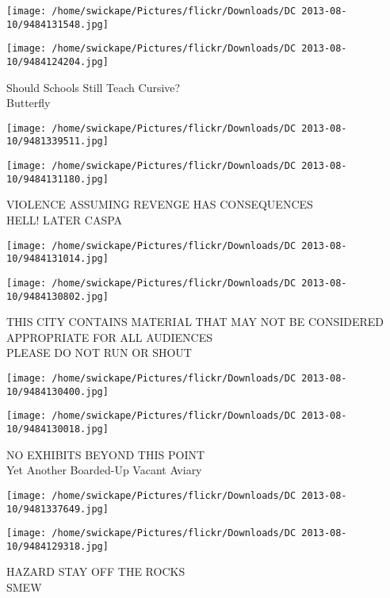 \documentclass[10pt,letterpaper]{article}
\begin{document}
\texttt{[image: /home/swickape/Pictures/flickr/Downloads/DC 2013-08-10/9484131548.jpg]}

\vspace{0.25in}
\texttt{[image: /home/swickape/Pictures/flickr/Downloads/DC 2013-08-10/9484124204.jpg]}

Should Schools Still Teach Cursive?\\
Butterfly\\
\pagebreak

\texttt{[image: /home/swickape/Pictures/flickr/Downloads/DC 2013-08-10/9481339511.jpg]}

\vspace{0.25in}
\texttt{[image: /home/swickape/Pictures/flickr/Downloads/DC 2013-08-10/9484131180.jpg]}

VIOLENCE ASSUMING REVENGE HAS CONSEQUENCES\\
HELL!  LATER CASPA\\
\pagebreak

\texttt{[image: /home/swickape/Pictures/flickr/Downloads/DC 2013-08-10/9484131014.jpg]}

\vspace{0.25in}
\texttt{[image: /home/swickape/Pictures/flickr/Downloads/DC 2013-08-10/9484130802.jpg]}

THIS CITY CONTAINS MATERIAL THAT MAY NOT BE CONSIDERED APPROPRIATE FOR ALL AUDIENCES\\
PLEASE DO NOT RUN OR SHOUT\\
\pagebreak

\texttt{[image: /home/swickape/Pictures/flickr/Downloads/DC 2013-08-10/9484130400.jpg]}

\vspace{0.25in}
\texttt{[image: /home/swickape/Pictures/flickr/Downloads/DC 2013-08-10/9484130018.jpg]}

NO EXHIBITS BEYOND THIS POINT\\
Yet Another Boarded{-}Up Vacant Aviary\\
\pagebreak

\texttt{[image: /home/swickape/Pictures/flickr/Downloads/DC 2013-08-10/9481337649.jpg]}

\vspace{0.25in}
\texttt{[image: /home/swickape/Pictures/flickr/Downloads/DC 2013-08-10/9484129318.jpg]}

HAZARD STAY OFF THE ROCKS\\
SMEW\\
\pagebreak
\end{document}
